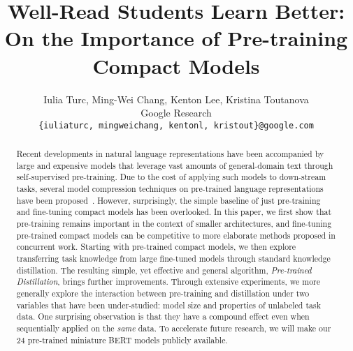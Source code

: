 \documentclass{article} %
\title{Well-Read Students Learn Better: On the Importance of Pre-training Compact Models}
\author{Iulia Turc, Ming-Wei Chang, Kenton Lee, Kristina Toutanova \\
Google Research \\
\texttt{\{iuliaturc, mingweichang, kentonl, kristout\}@google.com}
}
\begin{document}
\maketitle
\begin{abstract}
Recent developments in natural language representations have been accompanied by large and expensive models that leverage vast amounts of general-domain text through self-supervised pre-training. Due to the cost of applying such models to down-stream tasks, several model compression techniques on pre-trained language representations have been proposed~\cite{patient_kd, distil_bert}. However, surprisingly,  the simple baseline of just pre-training and fine-tuning compact models has been overlooked.
In this paper, we first show that pre-training remains important in the context of smaller architectures, and
fine-tuning pre-trained compact models can be competitive to more elaborate methods proposed in concurrent work. Starting with pre-trained compact models, we then explore transferring task knowledge from large fine-tuned models through standard knowledge distillation. The resulting simple, yet effective and general algorithm, \emph{Pre-trained Distillation}, brings further improvements. Through extensive experiments, we more generally explore the interaction between pre-training and distillation under two variables that have been under-studied: model size and properties of unlabeled task data. One surprising observation is that they have a compound effect even when sequentially applied on the \emph{same} data. To accelerate future research, we will make our 24 pre-trained miniature BERT models publicly available.




\end{abstract}
\end{document}
